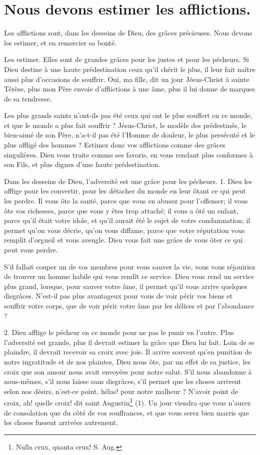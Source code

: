 \documentclass[instructions.tex]{subfiles}
\begin{document}
 
\chapter{Nous devons estimer les afflictions.}
 
Les afflictions sont, dans les desseins de Dieu, des grâces précieuses. Nous devons les estimer, et en remercier sa bonté.
 
\primo Les estimer. Elles sont de grandes grâces pour les justes et pour les pécheurs. Si Dieu destine à une haute prédestination ceux qu'il chérit le plus, il leur fait naître aussi plus d'occasions de souffrir. Oui, ma fille, dit un jour Jésus-Christ à sainte Térèse, plus mon Père envoie d'afflictions à une âme, plus il lui donne de marques de sa tendresse.
 
Les plus grands saints n'ont-ils pas été ceux qui ont le plus souffert en ce monde, et que le monde a plus fait souffrir ? Jésus-Christ, le modèle des prédestinés, le bien-aimé de son Père, n'a-t-il pas été l'Homme de douleur, le plus persécuté et le plus affligé des hommes ? Estimez donc vos afflictions comme des grâces singulières. Dieu vous traite comme ses favoris, en vous rendant plus conformes à son Fils, et plus dignes d'une haute prédestination.
 
Dans les desseins de Dieu, l'adversité est une grâce pour les pécheurs. 1. Dieu les afflige pour les convertir, pour les détacher du monde en leur ôtant ce qui peut les perdre. Il vous ôte la santé, parce que vous en abusez pour l'offenser; il vous ôte vos richesses, parce que vous y êtes trop attaché; il vous a ôté un enfant, parce qu'il était votre idole, et qu'il aurait été le sujet de votre condamnation; il permet qu'on vous décrie, qu'on vous diffame, parce que votre réputation vous remplit d'orgueil et vous aveugle. Dieu vous fait une grâce de vous ôter ce qui peut vous perdre.
 
S'il fallait couper un de vos membres pour vous sauver la vie, vous vous réjouiriez de trouver un homme habile qui vous rendît ce service. Dieu vous rend un service plus grand, lorsque, pour sauver votre âme, il permet qu'il vous arrive quelques disgrâces. N'est-il pas plus avantageux pour vous de voir périr vos biens et souffrir votre corps, que de voir périr votre âme par les délices et par l'abondance ?
 
2. Dieu afflige le pécheur en ce monde pour ne pas le punir en l'autre. Plus l'adversité est grande, plus il devrait estimer la grâce que Dieu lui fait. Loin de se plaindre, il devrait recevoir sa croix avec joie. Il arrive souvent qu'en punition de notre ingratitude et de nos plaintes, Dieu nous ôte, par un effet de sa justice, les croix que son amour nous avait envoyées pour notre salut. S'il nous abandonne à nous-mêmes, s'il nous laisse sans disgrâces, s'il permet que les choses arrivent selon nos désirs, n'est-ce point, hélas! pour notre malheur ? N'avoir point de croix, ah! quelle croix! dit saint Augustin\footnote{Nulla crux, quanta crux! S. Aug.} (1). Un jour viendra que vous n'aurez de consolation que du côté de vos souffrances, et que vous serez bien marris que les choses fussent arrivées autrement.
 
\end{document}
